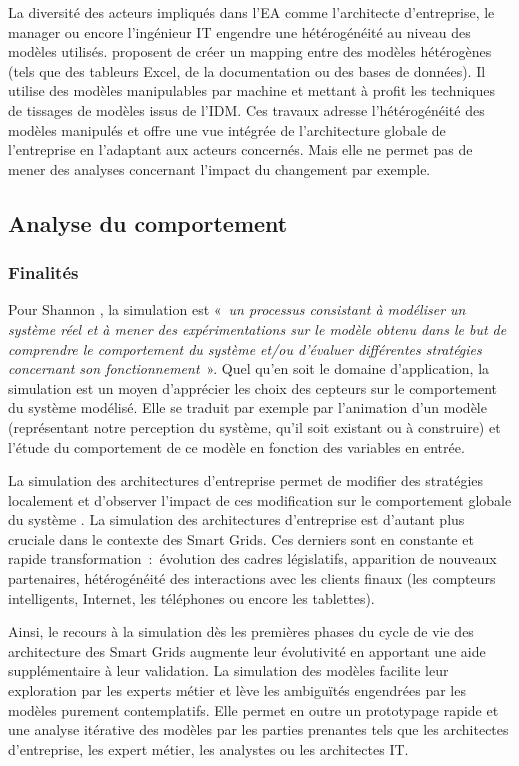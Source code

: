	La diversité des acteurs impliqués dans l'EA comme l'architecte d'entreprise, le manager ou encore l'ingénieur IT engendre une hétérogénéité au niveau des modèles utilisés. \cite{bruneliere2013support} proposent de créer un mapping entre des modèles hétérogènes (tels que des tableurs Excel, de la documentation ou des bases de données). Il utilise des modèles manipulables par machine et mettant à profit les techniques de tissages de modèles issus de l'IDM. Ces travaux adresse l'hétérogénéité des modèles manipulés et offre une vue intégrée de l'architecture globale de l'entreprise en l'adaptant aux acteurs concernés. Mais elle ne permet pas de mener des analyses concernant l'impact du changement par exemple.   

	
	\subsection{Analyse du comportement}
	\subsubsection{Finalités}
	Pour Shannon \cite{shannon1975systems}, la simulation est 
«~\emph{un processus consistant à modéliser un système réel et à mener des expérimentations sur le modèle obtenu dans le but de comprendre le comportement du système et/ou d'évaluer différentes stratégies concernant son fonctionnement}~». 
Quel qu'en soit le domaine d'application, la simulation est un moyen d'apprécier les choix des cepteurs sur le comportement du système modélisé. Elle se traduit par exemple par l'animation d'un modèle (représentant notre perception du système, qu'il soit existant ou à construire) et l'étude du comportement de ce modèle en fonction des variables en entrée.  

La simulation des architectures d'entreprise permet de modifier des stratégies localement et d'observer l'impact de ces modification sur le comportement globale du système \cite{2008towards}. La simulation des architectures d'entreprise est d'autant plus cruciale dans le contexte des Smart Grids. Ces derniers sont en constante et rapide transformation~:~évolution des cadres législatifs, apparition de nouveaux partenaires, hétérogénéité des interactions avec les clients finaux (les compteurs intelligents, Internet, les téléphones ou encore les tablettes). 

Ainsi, le recours à la simulation dès les premières phases du cycle de vie des architecture des Smart Grids augmente leur évolutivité en apportant une aide supplémentaire à leur validation. La simulation des modèles facilite leur exploration  par les experts métier et lève les ambiguïtés engendrées par les modèles purement contemplatifs. Elle permet en outre un prototypage rapide et une analyse itérative des modèles par les parties prenantes tels que les architectes d'entreprise, les expert métier, les analystes ou les architectes IT.

